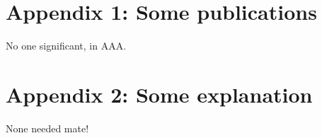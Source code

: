 
\section*{Appendix 1: Some publications}

No one significant, in AAA.

\section*{Appendix 2: Some explanation}

None needed mate!